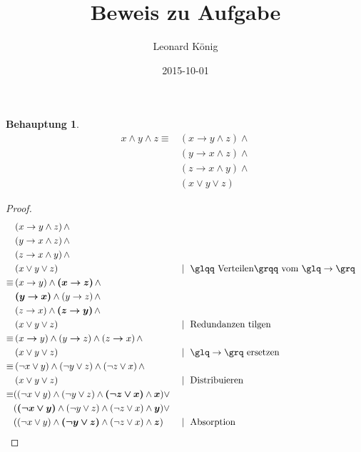 \documentclass[11pt, paper=a4]{scrartcl}
\author{Leonard K\"onig}
\title{Beweis zu Aufgabe}
\date{2015-10-01}
\newtheorem*{beh}{Behauptung}
\begin{document}
\begin{beh}
\begin{align*}
x \wedge y \wedge z \equiv
& \left(x \rightarrow y \wedge z\right) \wedge \\
& \left(y \rightarrow x \wedge z\right) \wedge \\
& \left(z \rightarrow x \wedge y\right) \wedge \\
& \left(x \vee y \vee z \right)
\end{align*}
\end{beh}
%
%
\begin{proof}
\begin{align}
& \left(x \rightarrow y \wedge z\right) \wedge \notag\\
& \left(y \rightarrow x \wedge z\right) \wedge \notag\\
& \left(z \rightarrow x \wedge y\right) \wedge \notag\\
& \left(x \vee y \vee z \right) && \mid\text{ \glqq Verteilen\grqq\ vom \glq}\rightarrow\text{\grq}\\
\equiv
%
& \left(x \rightarrow y\right) \wedge \bm{\left(x \rightarrow z\right)} \wedge \notag\\
& \bm{\left(y \rightarrow x\right)} \wedge \left(y \rightarrow z\right) \wedge \notag\\
& \left(z \rightarrow x\right) \wedge  \bm{\left(z \rightarrow y\right)} \wedge \notag\\
& \left(x \vee y \vee z \right) && \mid\text{ Redundanzen tilgen}\\
\equiv
%
& \left(x  \bm{\rightarrow} y\right) \wedge
\left(y  \bm{\rightarrow} z\right) \wedge
\left(z  \bm{\rightarrow} x\right) \wedge \notag\\
& \left(x \vee y \vee z \right) && \mid\text{ \glq}\rightarrow\text{\grq\ ersetzen}\\
\equiv
%
& \left(\neg x \vee y\right) \wedge
\left(\neg y \vee z\right) \wedge
\left(\neg z \vee x\right) \wedge \notag\\
& \left(x \vee y \vee z\right) && \mid\text{ Distribuieren}\\
\equiv
%
%
& (\left(\neg x \vee y\right) \wedge \left(\neg y \vee z\right) \wedge  \bm{\left(\neg z \vee x\right)} \wedge \bm{x}) \vee \notag\\
& ( \bm{\left(\neg x \vee y\right)} \wedge \left(\neg y \vee z\right) \wedge \left(\neg z \vee x\right) \wedge  \bm{y}) \vee \notag\\
& (\left(\neg x \vee y\right) \wedge  \bm{\left(\neg y \vee z\right)} \wedge \left(\neg z \vee x\right) \wedge \bm{z}) && \mid\text{ Absorption}\\

\end{align}
\end{proof}
\end{document}
